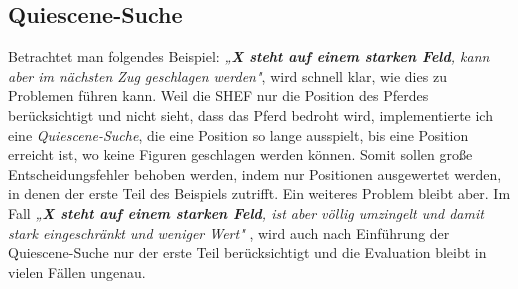 \documentclass{jpp}
\begin{document}
\subsection{Quiescene-Suche}
Betrachtet man folgendes Beispiel: \textit{„\textbf{X steht auf einem starken Feld}, kann aber im nächsten Zug geschlagen werden"}, wird schnell klar, wie dies zu Problemen führen kann. Weil die SHEF nur die Position des Pferdes berücksichtigt und nicht sieht, dass das Pferd bedroht wird, implementierte ich eine \textit{Quiescene-Suche}, die eine Position so lange ausspielt, bis eine Position erreicht ist, wo keine Figuren geschlagen werden können. Somit sollen große Entscheidungsfehler behoben werden, indem nur Positionen ausgewertet werden, in denen der erste Teil des Beispiels zutrifft.
Ein weiteres Problem bleibt aber. Im Fall \textit{„\textbf{X steht auf einem starken Feld}, ist aber völlig umzingelt und damit stark eingeschränkt und weniger Wert"} , wird auch nach Einführung der Quiescene-Suche nur der erste Teil berücksichtigt und die Evaluation bleibt in vielen Fällen ungenau.
\end{document}
